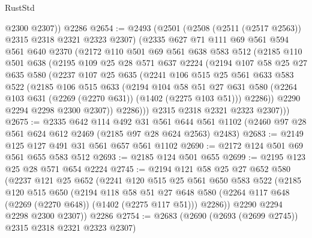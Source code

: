 \begin{lexlean}{RustStd}
\begin{coremodule}
        @2300
        @2307))
    @2286
@2654 := @2493
    (@2501
      (@2508 (@2511 (@2517 @2563)) @2315 @2318 @2321 @2323 @2307)
      (@2335
        @627
        @71
        @111
        @69
        @561
        @594
        @561
        @640
        @2370
        (@2172
          @110
          @501
          @69
          @561
          @638
          @583
          @512
          (@2185
            @110
            @501
            @638
            (@2195
              @109
              @25
              @28
              @571
              @637
              @2224
              (@2194
                @107
                @58
                @25
                @27
                @635
                @580
                (@2237
                  @107
                  @25
                  @635
                  (@2241
                    @106
                    @515
                    @25
                    @561
                    @633
                    @583
                    @522
                    (@2185
                      @106
                      @515
                      @633
                      (@2194
                        @104
                        @58
                        @51
                        @27
                        @631
                        @580
                        (@2264 @103 @631 (@2269 (@2270 @631)) (@1402 (@2275 @103 @51)))
                        @2286))
                    @2290
                    @2294
                    @2298
                    @2300
                    @2307))
                @2286)))
          @2315
          @2318
          @2321
          @2323
          @2307)))
@2675 := @2335
    @642
    @114
    @492
    @31
    @561
    @644
    @561
    @1102
    (@2460 @97 @28 @561 @624 @612 @2469 (@2185 @97 @28 @624 @2563) @2483)
@2683 := @2149 @125 @127 @491 @31 @561 @657 @561 @1102
@2690 := @2172 @124 @501 @69 @561 @655 @583 @512
@2693 := @2185 @124 @501 @655
@2699 := @2195 @123 @25 @28 @571 @654 @2224
@2745 := @2194
    @121
    @58
    @25
    @27
    @652
    @580
    (@2237
      @121
      @25
      @652
      (@2241
        @120
        @515
        @25
        @561
        @650
        @583
        @522
        (@2185
          @120
          @515
          @650
          (@2194
            @118
            @58
            @51
            @27
            @648
            @580
            (@2264 @117 @648 (@2269 (@2270 @648)) (@1402 (@2275 @117 @51)))
            @2286))
        @2290
        @2294
        @2298
        @2300
        @2307))
    @2286
@2754 := @2683 (@2690 (@2693 (@2699 @2745)) @2315 @2318 @2321 @2323 @2307)

\end{coremodule}
\end{lexlean}
